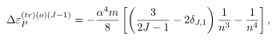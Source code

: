\begin{equation}
\Delta \varepsilon _{P}^{\left( tr\right) \left( o\right) (J-1)}=-\frac{%
\alpha ^{4}m}{8}\left[ \left( \frac{3}{2J-1}-2\delta _{J,1}\right) \frac{1}{%
n^{3}}-\frac{1}{n^{4}}\right] ,
\end{equation}

